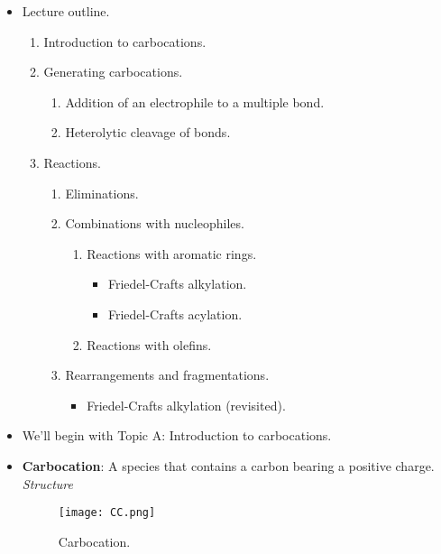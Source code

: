 \documentclass[../notes.tex]{subfiles}
\begin{document}
\begin{itemize}
\begin{itemize}
    \end{itemize}
    \item Lecture outline.
    \begin{enumerate}[label={\Alph*.}]
        \item Introduction to carbocations.
        \item Generating carbocations.
        \begin{enumerate}[label={\arabic*)}]
            \item Addition of an electrophile to a multiple bond.
            \item Heterolytic cleavage of  bonds.
        \end{enumerate}
        \item Reactions.
        \begin{enumerate}[label={\arabic*)}]
            \item Eliminations.
            \item Combinations with nucleophiles.
            \begin{enumerate}[label={\alph*)},start=2]
                \item Reactions with aromatic rings.
                \begin{itemize}
                    \item Friedel-Crafts alkylation.
                    \item Friedel-Crafts acylation.
                \end{itemize}
                \item Reactions with olefins.
            \end{enumerate}
            \item Rearrangements and fragmentations.
            \begin{itemize}
                \item Friedel-Crafts alkylation (revisited).
            \end{itemize}
        \end{enumerate}
    \end{enumerate}
    \item We'll begin with Topic A: Introduction to carbocations.
    \item \textbf{Carbocation}: A species that contains a carbon bearing a positive charge. \emph{Structure}
    \begin{figure}[H]
        \centering
        \texttt{[image: CC.png]}
        \caption{Carbocation.}
        \label{fig:CC}
    \end{figure}

\end{itemize}
\end{document}
